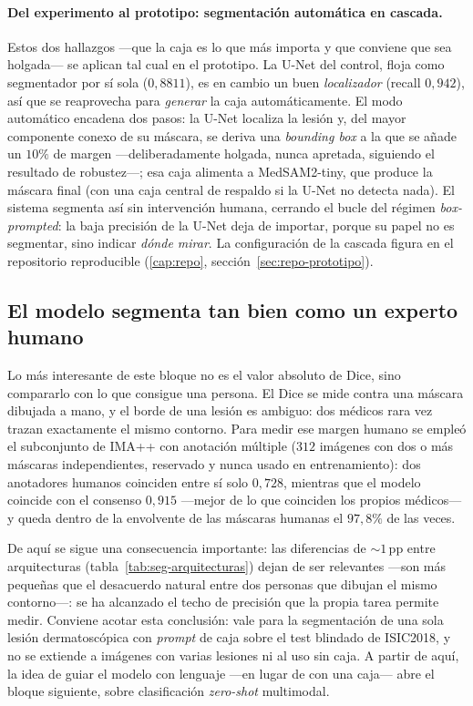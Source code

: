 \paragraph{Del experimento al prototipo: segmentación automática en
cascada.}
Estos dos hallazgos ---que la caja es lo que más importa y que conviene
que sea holgada--- se aplican tal cual en el prototipo. La U-Net del
control, floja como segmentador por sí sola ($0{,}8811$), es en cambio
un buen \emph{localizador} (recall $0{,}942$), así que se reaprovecha
para \emph{generar} la caja automáticamente. El modo automático
encadena dos pasos: la U-Net localiza la lesión y, del mayor componente
conexo de su máscara, se deriva una \emph{bounding box} a la que se
añade un $10\%$ de margen ---deliberadamente holgada, nunca apretada,
siguiendo el resultado de robustez---; esa caja alimenta a MedSAM2-tiny,
que produce la máscara final (con una caja central de respaldo si la
U-Net no detecta nada). El sistema segmenta así sin intervención
humana, cerrando el bucle del régimen \emph{box-prompted}: la baja
precisión de la U-Net deja de importar, porque su papel no es segmentar,
sino indicar \emph{dónde mirar}. La configuración de la cascada figura
en el repositorio reproducible (\ref{cap:repo},
sección~\ref{sec:repo-prototipo}).

\subsection{El modelo segmenta tan bien como un experto humano}
\label{sec:seg-techo-anotador}

Lo más interesante de este bloque no es el valor absoluto de Dice, sino
compararlo con lo que consigue una persona. El Dice se mide contra una
máscara dibujada a mano, y el borde de una lesión es ambiguo: dos
médicos rara vez trazan exactamente el mismo contorno. Para medir ese
margen humano se empleó el subconjunto de IMA++ con anotación múltiple
($312$ imágenes con dos o más máscaras independientes, reservado y
nunca usado en entrenamiento): dos anotadores humanos coinciden entre
sí solo $0{,}728$, mientras que el modelo coincide con el consenso
$0{,}915$ ---mejor de lo que coinciden los propios médicos--- y queda
dentro de la envolvente de las máscaras humanas el $97{,}8\%$ de las
veces.

De aquí se sigue una consecuencia importante: las diferencias de
$\sim 1$\,pp entre
arquitecturas (tabla~\ref{tab:seg-arquitecturas}) dejan de ser
relevantes ---son más pequeñas que el desacuerdo natural entre dos
personas que dibujan el mismo contorno---: se ha alcanzado el techo de
precisión que la propia tarea permite medir. Conviene acotar esta
conclusión: vale para la segmentación de una sola lesión dermatoscópica
con \emph{prompt} de caja sobre el test blindado de ISIC2018, y no se
extiende a imágenes con varias lesiones ni al uso sin caja. A partir de
aquí, la idea de guiar el modelo con lenguaje ---en lugar de con una
caja--- abre el bloque siguiente, sobre clasificación \emph{zero-shot}
multimodal.

